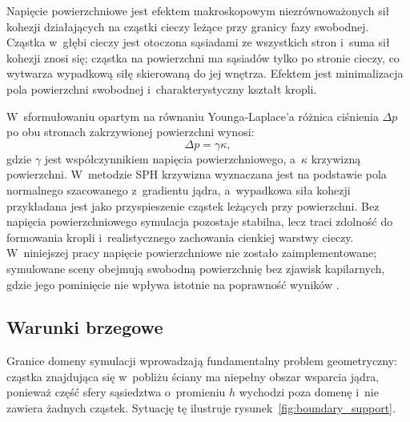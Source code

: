 Napięcie powierzchniowe jest efektem makroskopowym niezrównoważonych sił kohezji
działających na cząstki cieczy leżące przy granicy fazy swobodnej. Cząstka
w~głębi cieczy jest otoczona sąsiadami ze wszystkich stron i~suma sił kohezji
znosi się; cząstka na powierzchni ma sąsiadów tylko po stronie cieczy, co
wytwarza wypadkową siłę skierowaną do jej wnętrza. Efektem jest minimalizacja
pola powierzchni swobodnej i~charakterystyczny kształt kropli.

W~sformułowaniu opartym na równaniu Younga-Laplace'a \cite{batchelor1967introduction}
różnica ciśnienia $\Delta p$ po obu stronach zakrzywionej powierzchni wynosi:
\begin{equation}
    \Delta p = \gamma \kappa,
\end{equation}
gdzie $\gamma$ jest współczynnikiem napięcia powierzchniowego, a~$\kappa$ krzywizną
powierzchni. W~metodzie SPH krzywizna wyznaczana jest na podstawie pola normalnego
szacowanego z~gradientu jądra, a~wypadkowa siła kohezji przykładana jest jako
przyspieszenie cząstek leżących przy powierzchni. Bez napięcia powierzchniowego
symulacja pozostaje stabilna, lecz traci zdolność do formowania kropli
i~realistycznego zachowania cienkiej warstwy cieczy. W~niniejszej pracy napięcie
powierzchniowe nie zostało zaimplementowane; symulowane sceny obejmują swobodną
powierzchnię bez zjawisk kapilarnych, gdzie jego pominięcie nie wpływa istotnie
na poprawność wyników \cite{koschier2020smoothed}.

\subsection{Warunki brzegowe}

Granice domeny symulacji wprowadzają fundamentalny problem geometryczny: cząstka
znajdująca się w~pobliżu ściany ma niepełny obszar wsparcia jądra, ponieważ część
sfery sąsiedztwa o~promieniu $h$ wychodzi poza domenę i~nie zawiera żadnych
cząstek. Sytuację tę ilustruje rysunek~\ref{fig:boundary_support}.

